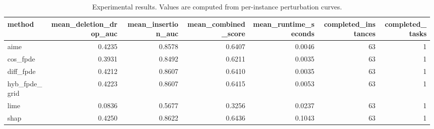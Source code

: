 \begin{table}[t]
\caption{Experimental results. Values are computed from per-instance perturbation curves.}
\label{tab:main_results_computed}
\centering
\begin{tabular}{lrrrrrr}
\toprule
method & mean\_deletion\_drop\_auc & mean\_insertion\_auc & mean\_combined\_score & mean\_runtime\_seconds & completed\_instances & completed\_tasks \\
\midrule
aime & 0.4235 & 0.8578 & 0.6407 & 0.0046 & 63 & 1 \\
cos\_fpde & 0.3931 & 0.8492 & 0.6211 & 0.0035 & 63 & 1 \\
diff\_fpde & 0.4212 & 0.8607 & 0.6410 & 0.0035 & 63 & 1 \\
hyb\_fpde\_grid & 0.4223 & 0.8607 & 0.6415 & 0.0053 & 63 & 1 \\
lime & 0.0836 & 0.5677 & 0.3256 & 0.0237 & 63 & 1 \\
shap & 0.4250 & 0.8622 & 0.6436 & 0.1043 & 63 & 1 \\
\bottomrule
\end{tabular}

\end{table}
